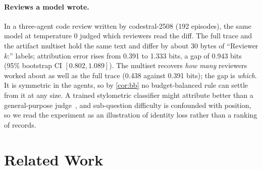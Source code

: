\documentclass[sigconf,anonymous,acmthm=false]{acmart}
\theoremstyle{acmplain}
\theoremstyle{acmdefinition}
\begin{document}
\paragraph{Reviews a model wrote.} In a three-agent code review written by codestral-2508 (192
episodes), the same model at temperature 0 judged which reviewers read the diff. The full
trace and the artifact multiset hold the same text and differ by about 30 bytes of
``Reviewer $k$:'' labels; attribution error rises from 0.391 to 1.333 bits, a gap of 0.943 bits
(95\% bootstrap CI $[0.802,1.089]$). The multiset recovers \emph{how many} reviewers worked
about as well as the full trace (0.438 against 0.391 bits); the gap is \emph{which}. It is
symmetric in the agents, so by \cref{cor:bb} no budget-balanced rule can settle from it at any
size. A trained stylometric classifier might attribute better than a general-purpose
judge~\cite{dietrich2026peers}, and sub-question difficulty is confounded with position, so we
read the experiment as an illustration of identity loss rather than a ranking of records.

\section{Related Work}\label{sec:related}
\end{document}
